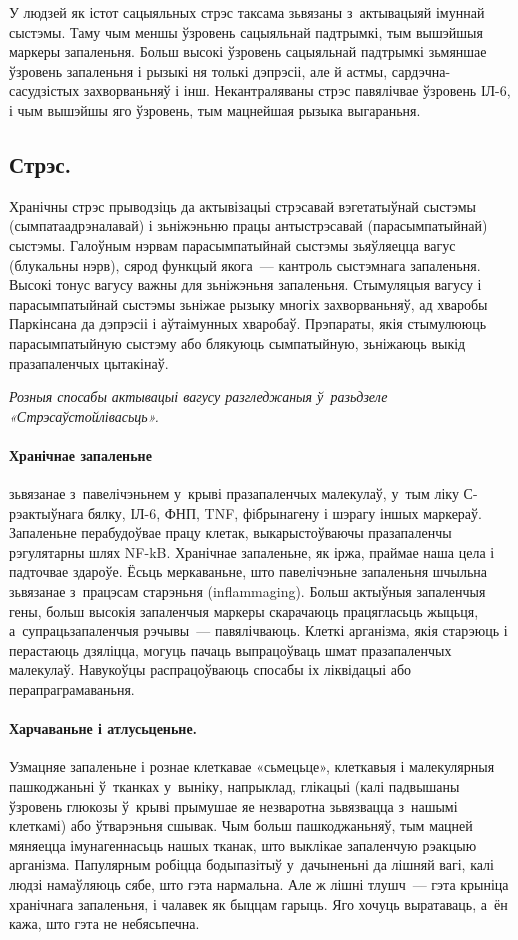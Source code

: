 У людзей як істот сацыяльных стрэс таксама зьвязаны з~актывацыяй імуннай сыстэмы. Таму чым меншы ўзровень сацыяльнай падтрымкі, тым вышэйшыя маркеры запаленьня. Больш высокі ўзровень сацыяльнай падтрымкі зьмяншае ўзровень запаленьня і рызыкі ня толькі дэпрэсіі, але й астмы, сардэчна-сасудзістых захворваньняў і інш. Некантраляваны стрэс павялічвае ўзровень ІЛ-6, і чым вышэйшы яго ўзровень, тым мацнейшая рызыка выгараньня.

\subsection*{Стрэс.}

Хранічны стрэс прыводзіць да актывізацыі стрэсавай вэгетатыўнай сыстэмы (сымпатаадрэналавай) і зьніжэньню працы антыстрэсавай (парасымпатыйнай) сыстэмы. Галоўным нэрвам парасымпатыйнай сыстэмы зьяўляецца вагус (блукальны нэрв), сярод функцый якога~--- кантроль сыстэмнага запаленьня. Высокі тонус вагусу важны для зьніжэньня запаленьня. Стымуляцыя вагусу і парасымпатыйнай сыстэмы зьніжае рызыку многіх захворваньняў, ад хваробы Паркінсана да дэпрэсіі і аўтаімунных хваробаў. Прэпараты, якія стымулююць парасымпатыйную сыстэму або блякуюць сымпатыйную, зьніжаюць выкід празапаленчых цытакінаў. 

\emph{Розныя спосабы актывацыі вагусу разгледжаныя ў~разьдзеле «Стрэсаўстойлівасьць».}

\paragraph{Хранічнае запаленьне} зьвязанае з~павелічэньнем у~крыві празапаленчых малекулаў, у~тым ліку С-рэактыўнага бялку, ІЛ-6, ФНП, TNF, фібрынагену і шэрагу іншых маркераў. Запаленьне перабудоўвае працу клетак, выкарыстоўваючы празапаленчы рэгулятарны шлях NF-kB. Хранічнае запаленьне, як іржа, праймае наша цела і падточвае здароўе. Ёсьць меркаваньне, што павелічэньне запаленьня шчыльна зьвязанае з~працэсам старэньня (inflammaging). Больш актыўныя запаленчыя гены, больш высокія запаленчыя маркеры скарачаюць працягласьць жыцьця, а~супрацьзапаленчыя рэчывы~--- павялічваюць. Клеткі арганізма, якія старэюць і перастаюць дзяліцца, могуць пачаць выпрацоўваць шмат празапаленчых малекулаў. Навукоўцы распрацоўваюць спосабы іх ліквідацыі або перапраграмаваньня.

\paragraph{Харчаваньне і атлусьценьне.} Узмацняе запаленьне і рознае клеткавае «сьмецьце», клеткавыя і малекулярныя пашкоджаньні ў~тканках у~выніку, напрыклад, глікацыі (калі падвышаны ўзровень глюкозы ў~крыві прымушае яе незваротна зьвязвацца з~нашымі клеткамі) або ўтварэньня сшывак. Чым больш пашкоджаньняў, тым мацней мяняецца імунагеннасьць нашых тканак, што выклікае запаленчую рэакцыю арганізма. Папулярным робіцца бодыпазітыў у~дачыненьні да лішняй вагі, калі людзі намаўляюць сябе, што гэта нармальна. Але ж лішні тлушч~--- гэта крыніца хранічнага запаленьня, і чалавек як быццам гарыць. Яго хочуць выратаваць, а~ён кажа, што гэта не небясьпечна.

